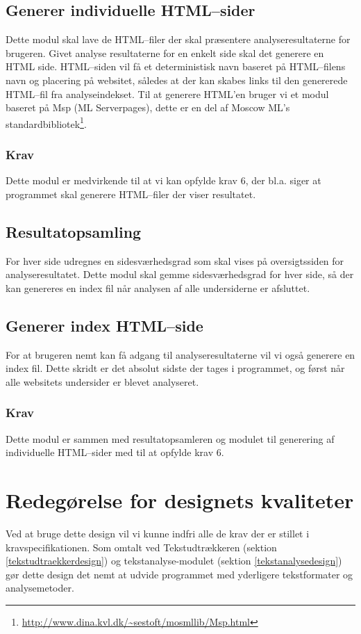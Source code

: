 \documentclass[a4paper,oneside]{memoir}
\begin{document}
\subsection{Generer individuelle HTML--sider}
Dette modul skal lave de HTML--filer der skal præsentere
analyseresultaterne for brugeren. Givet analyse resultaterne for en
enkelt side skal det generere en HTML side. HTML--siden vil få et
deterministisk navn baseret på HTML--filens navn og placering på
websitet, således at der kan skabes links til den genererede HTML--fil
fra analyseindekset. Til at generere HTML'en bruger vi et modul
baseret på Msp (ML Serverpages), dette er en del af Moscow ML's
standardbibliotek\footnote{\url{http://www.dina.kvl.dk/~sestoft/mosmllib/Msp.html}}.

\subsubsection{Krav}
Dette modul er medvirkende til at vi kan opfylde krav 6, der
bl.a. siger at programmet skal generere HTML--filer der viser
resultatet.

\subsection{Resultatopsamling}
For hver side udregnes en sidesværhedsgrad som skal vises på
oversigtssiden for analyseresultatet. Dette modul skal gemme
sidesværhedsgrad for hver side, så der kan genereres en index fil når
analysen af alle undersiderne er afsluttet.

\subsection{Generer index HTML--side}
For at brugeren nemt kan få adgang til analyseresultaterne vil vi også
generere en index fil. Dette skridt er det absolut sidste der tages i
programmet, og først når alle websitets undersider er blevet
analyseret.

\subsubsection{Krav}
Dette modul er sammen med resultatopsamleren og modulet til generering
af individuelle HTML--sider med til at opfylde krav 6.

\section{Redegørelse for designets kvaliteter}
Ved at bruge dette design vil vi kunne indfri alle de krav der er
stillet i kravspecifikationen. Som omtalt ved Tekstudtrækkeren
(sektion \ref{tekstudtraekkerdesign}) og tekstanalyse-modulet
(sektion \ref{tekstanalysedesign}) gør dette design det nemt at udvide
programmet med yderligere tekstformater og analysemetoder.
\end{document}
